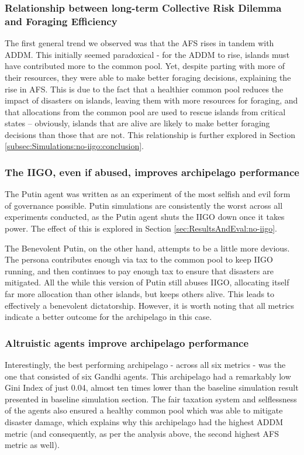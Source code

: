 \documentclass{article}
\begin{document}
\subsubsection{Relationship between long-term Collective Risk Dilemma and Foraging Efficiency}
The first general trend we observed was that the AFS rises in tandem with ADDM. This initially seemed paradoxical - for the ADDM to rise, islands must have contributed more to the common pool. Yet, despite parting with more of their resources, they were able to make better foraging decisions, explaining the rise in AFS. This is due to the fact that a healthier common pool reduces the impact of disasters on islands, leaving them with more resources for foraging, and that allocations from the common pool are used to rescue islands from critical states -- obviously, islands that are alive are likely to make better foraging decisions than those that are not. This relationship is further explored in Section \ref{subsec:Simulations:no-iigo:conclusion}.

\subsubsection{The IIGO, even if abused, improves archipelago performance}
The Putin agent was written as an experiment of the most selfish and evil form of governance possible. Putin simulations are consistently the worst across all experiments conducted, as the Putin agent shuts the IIGO down once it takes power. The effect of this is explored in Section \ref{sec:ResultsAndEval:no-iigo}. 

The Benevolent Putin, on the other hand, attempts to be a little more devious. The persona contributes enough via tax to the common pool to keep IIGO running, and then continues to pay enough tax to ensure that disasters are mitigated. All the while this version of Putin still abuses IIGO, allocating itself far more allocation than other islands, but keeps others alive. This leads to effectively a benevolent dictatorship. However, it is worth noting that all metrics indicate a better outcome for the archipelago in this case.

\subsubsection{Altruistic agents improve archipelago performance}

Interestingly, the best performing archipelago - across all six metrics - was the one that consisted of six Gandhi agents. This archipelago had a remarkably low Gini Index of just 0.04, almost ten times lower than the baseline simulation result presented in baseline simulation section. The fair taxation system and selflessness of the agents also ensured a healthy common pool which was able to mitigate disaster damage, which explains why this archipelago had the highest ADDM metric (and consequently, as per the analysis above, the second highest AFS metric as well).
\end{document}

